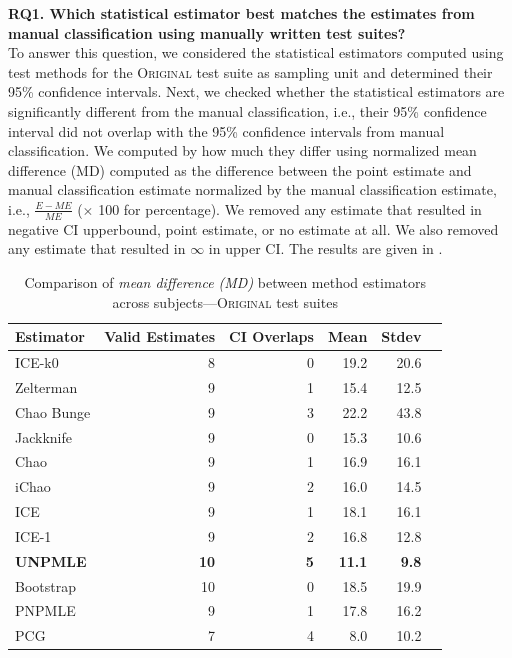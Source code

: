 \documentclass[sigconf,review,anonymous]{acmart}
\newcommand{\ICEallrare}{ICE-k0\xspace}
\newcommand{\Zelterman}{Zelterman\xspace}
\newcommand{\ChaoBunge}{Chao Bunge\xspace}
\newcommand{\Jackknife}{Jackknife\xspace}
\newcommand{\Chao}{Chao\xspace}
\newcommand{\improvedChao}{iChao\xspace}
\newcommand{\ICE}{ICE\xspace}
\newcommand{\improvedICE}{ICE-1\xspace}
\newcommand{\Unpmle}{UNPMLE\xspace}
\newcommand{\Bootstrap}{Bootstrap\xspace}
\newcommand{\Pnpmle}{PNPMLE\xspace}
\newcommand{\PCG}{PCG\xspace}
\newcommand{\original}{\textsc{Original}\xspace}
\newcommand{\B}[1]{\textbf{#1}}
\begin{document}
\noindent\textbf{RQ1. Which statistical estimator best matches the
estimates from manual classification %
using manually written test suites?}\\
%
To answer this question, we considered the statistical estimators computed
using test methods for the \original test suite as sampling unit and determined
their 95\% confidence intervals.
%
Next, we checked whether the statistical estimators are significantly different
from the manual classification, i.e.,  their 95\% confidence interval did not overlap
with the 95\% confidence intervals from manual classification. We computed
by how much they differ using normalized mean difference (MD) computed as the
difference between the point estimate and manual classification estimate
normalized by the manual classification estimate, i.e., $\frac{E - ME}{ME}$ ($\times$
100 for percentage). We removed any estimate that resulted in negative
CI upperbound, point estimate, or no estimate at all. We also removed any
estimate that resulted in $\infty$ in upper CI. The results are given in
.

\begin{table}
\caption{Comparison of \emph{mean difference (MD)} between method estimators
across subjects---\original test suites}
\begin{tabular}{|l|r|r|r|r|r|}
\hline

Estimator	&Valid Estimates	&CI Overlaps	&Mean	&Stdev	\\
\hline
\ICEallrare		&	8	&	0	&19.2	&	20.6\\
\Zelterman		&	9	&	1	&15.4	&	12.5\\
\ChaoBunge		&	9	&	3	&22.2	&	43.8\\
\Jackknife		&	9	&	0	&15.3	&	10.6\\
\Chao	        	&	9	&	1	&16.9	&	16.1\\
\improvedChao		&	9	&	2	&16.0	&	14.5\\
\ICE			&	9	&	1	&18.1	&	16.1\\
\improvedICE		&	9	&	2	&16.8	&	12.8\\
\B{\Unpmle}			&	\B{10}	&	\B{5}	& \B{11.1}	&	\B{9.8}\\
\Bootstrap		&	10	&	0	&18.5	&	19.9\\
\Pnpmle			&	9	&	1	&17.8	&	16.2\\
\PCG			&	7	&	4	&8.0	&	10.2\\
\hline
\end{tabular}
\label{tbl:estoriginal}
\end{table}
\end{document}
